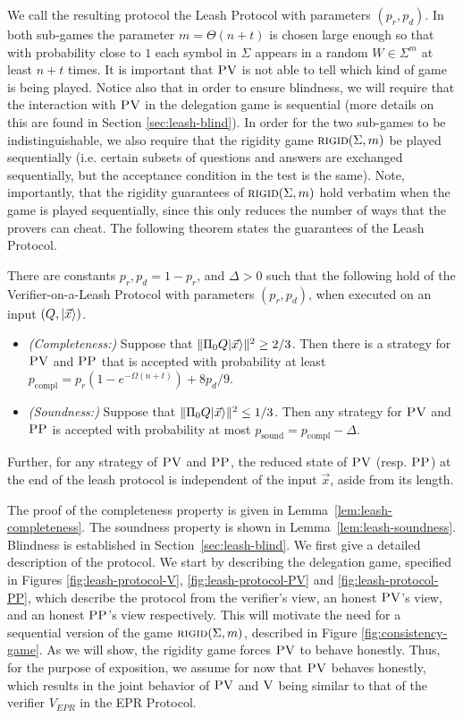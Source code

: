 We call the resulting protocol the Leash Protocol with parameters $(p_r,p_d)$. In both sub-games the parameter $m=\Theta(n+t)$ is chosen large enough so that with probability close to $1$ each symbol in $\Sigma$ appears in a random $W\in \Sigma^m$ at least $n+t$ times. It is important that $\textsc{PV}$ is not able to tell which kind of game is being played. Notice also that in order to ensure blindness, we will require that the interaction with $\textsc{PV}$ in the delegation game is sequential (more details on this are found in Section \ref{sec:leash-blind}). In order for the two sub-games to be indistinguishable, we also require that the rigidity game $\textsc{rigid}(\Sigma,m)$ be played sequentially (i.e. certain subsets of questions and answers are exchanged sequentially, but the acceptance condition in the test is the same). Note, importantly, that the rigidity guarantees of $\textsc{rigid}(\Sigma,m)$ hold verbatim when the game is played sequentially, since this only reduces the number of ways that the provers can cheat. The following theorem states the guarantees of the Leash Protocol.

\begin{theorem}\label{thm:leash}
There are constants $p_r,p_d=1-p_r$, and $\Delta>0$ such that the following hold of the Verifier-on-a-Leash Protocol with parameters $(p_r,p_d)$, when executed on an input $(Q,|\vec{x}\rangle)$.
\begin{itemize}
\item \emph{(Completeness:)} Suppose that $\|\Pi_0 Q|\vec{x}\rangle\|^2 \geq 2/3$. Then there is a strategy for $\textsc{PV}$ and $\textsc{PP}$ that is accepted with probability at least $p_{\mathrm{compl}} = p_r(1-e^{-\Omega(n+t)})+8p_d/9$. 
\item \emph{(Soundness:)} Suppose that $\|\Pi_0 Q|\vec{x}\rangle\|^2 \leq 1/3$. Then any strategy for $\textsc{PV}$ and $\textsc{PP}$ is accepted with probability at most $p_{\mathrm{sound}} = p_{\mathrm{compl}} - \Delta$. 
\end{itemize}
Further, for any strategy of $\textsc{PV}$ and $\textsc{PP}$, the reduced state of $\textsc{PV}$
(resp. $\textsc{PP}$) at the end of the leash protocol is independent of the input $\vec{x}$, aside from its length.
\end{theorem}



The proof of the completeness property is given in Lemma~\ref{lem:leash-completeness}. The soundness property is shown in Lemma~\ref{lem:leash-soundness}. Blindness is established in Section~\ref{sec:leash-blind}. 
We first give a detailed description of the protocol. We start by describing the delegation game, specified in Figures \ref{fig:leash-protocol-V}, \ref{fig:leash-protocol-PV} and \ref{fig:leash-protocol-PP}, which describe the protocol from the verifier's view, an honest $\textsc{PV}$'s view, and an honest $\textsc{PP}$'s view respectively. This will motivate the need for a sequential version of the game $\textsc{rigid}(\Sigma,m)$, described in Figure \ref{fig:consistency-game}. As we will show, the rigidity game forces $\textsc{PV}$ to behave honestly. Thus, for the purpose of exposition, we assume for now that $\textsc{PV}$ behaves honestly, which results in the joint behavior of $\textsc{PV}$ and $\textsc{V}$ being similar to that of the verifier $V_{EPR}$ in the EPR Protocol. 

